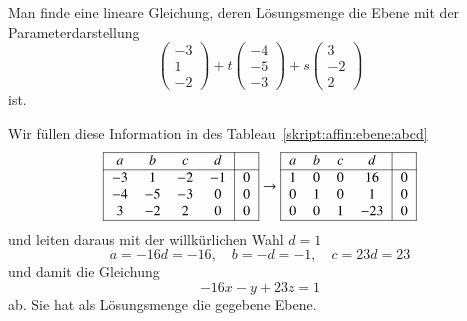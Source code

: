 \begin{beispiel}
Man finde eine lineare Gleichung, deren Lösungsmenge die Ebene mit der
Parameterdarstellung
\[
\begin{pmatrix}-3\\1\\-2\end{pmatrix}
+t
\begin{pmatrix}-4\\-5\\-3\end{pmatrix}
+s
\begin{pmatrix} 3\\-2\\ 2\end{pmatrix}
\]
ist.

\smallskip

{\parindent=0pt Wir} füllen diese Information in des Tableau~\eqref{skript:affin:ebene:abcd}
\[
\begin{tabular}{|
>{$}c<{$}
>{$}c<{$}
>{$}c<{$}
>{$}c<{$}|
>{$}c<{$}|}
\hline
a&b&c&d&\\
\hline
  -3&  1& -2& -1&  0\\
  -4& -5& -3&  0&  0\\
   3& -2&  2&  0&  0\\
\hline
\end{tabular}
\rightarrow
\begin{tabular}{|
>{$}c<{$}
>{$}c<{$}
>{$}c<{$}
>{$}c<{$}|
>{$}c<{$}|}
\hline
a&b&c&d&\\
\hline
    1&   0&   0&  16&  0\\
    0&   1&   0&   1&   0\\
    0&   0&   1& -23&   0\\
\hline
\end{tabular}
\]
und leiten daraus mit der willkürlichen Wahl $d=1$ 
\[
a=-16d=-16,
\quad
b=-d=-1,
\quad
c=23d=23
\]
und damit die Gleichung
\[
-16x-y+23z=1
\]
ab.
Sie hat als Lösungsmenge die gegebene Ebene.
\end{beispiel}

